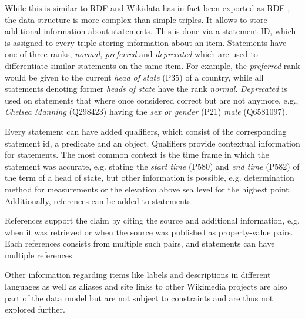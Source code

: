 \documentclass[hyperref,bachelorofscience,fleqn]{cgvpub}
\begin{document}
While this is similar to RDF and Wikidata has in fact been exported as RDF \cite{EGKMV2014}, the data structure is more complex than simple triples. It allows to store additional information about statements. This is done via a statement ID, which is assigned to every triple storing information about an item. Statements have one of three ranks, \emph{normal}, \emph{preferred} and \emph{deprecated} which are used to differentiate similar statements on the same item. For example, the \emph{preferred} rank would be given to the current \emph{head of state} (P35) of a country, while all statements denoting former \emph{heads of state} have the rank \emph{normal}. \emph{Deprecated} is used on statements that where once considered correct but are not anymore, e.g., \emph{Chelsea Manning} (Q298423) having the \emph{sex or gender} (P21) \emph{male} (Q6581097).

Every statement can have added qualifiers, which consist of the corresponding statement id, a predicate and an object. Qualifiers provide contextual information for statements. The most common context is the time frame in which the statement was accurate, e.g. stating the \emph{start time} (P580) and \emph{end time} (P582) of the term of a head of state, but other information is possible, e.g. determination method for measurements or the elevation above sea level for the highest point. Additionally, references can be added to statements.

References support the claim by citing the source and additional information, e.g. when it was retrieved or when the source was published as property-value pairs. Each references consists from multiple such pairs, and statements can have multiple references.

Other information regarding items like labels and descriptions in different languages as well as aliases and site links to other Wikimedia projects are also part of the data model but are not subject to constraints and are thus not explored further.
\end{document}
